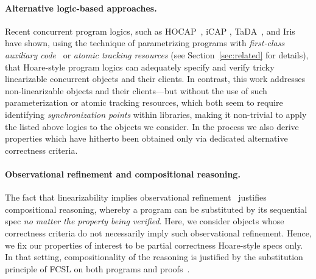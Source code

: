 \paragraph{Alternative logic-based approaches.}

Recent concurrent program logics, such as
HOCAP~\cite{Svendsen-al:ESOP13}, iCAP \cite{Svendsen-Birkedal:ESOP14},
TaDA~\cite{ArrozPincho-al:ECOOP14}, and Iris~\cite{Jung-al:POPL15}
have shown, using the technique of parametrizing programs with
\emph{first-class auxiliary code}~\cite{Jacobs-Piessens:POPL11} or
\emph{atomic tracking resources} (see Section~\ref{sec:related} for
details), that Hoare-style program logics can adequately specify and
verify tricky linearizable concurrent objects and their clients. In
contrast, this work addresses non-linearizable objects and their
clients---but without the use of such parameterization or atomic
tracking resources, which both seem to require identifying
\emph{synchronization points} within libraries, making it non-trivial
to apply the listed above logics to the objects we consider. In the
process we also derive properties which have hitherto been obtained
only via dedicated alternative correctness criteria.

\paragraph{Observational refinement and compositional reasoning.}
The fact that linearizability implies observational
refinement~\cite{Filipovic-al:TCS10, Cerone-al:ICALP14,
  Bouajjani-al:POPL15, Emmi-al:PLDI15} justifies compositional
reasoning, whereby a program can be substituted by its sequential spec
\emph{no matter the property being verified}. Here, we consider
objects whose correctness criteria do not necessarily imply such
observational refinement. Hence, we fix our properties of interest to
be partial correctness Hoare-style specs only. In that setting,
compositionality of the reasoning is justified by the substitution
principle of FCSL on both programs and
proofs~\cite{Nanevski-al:ESOP14}.
%







